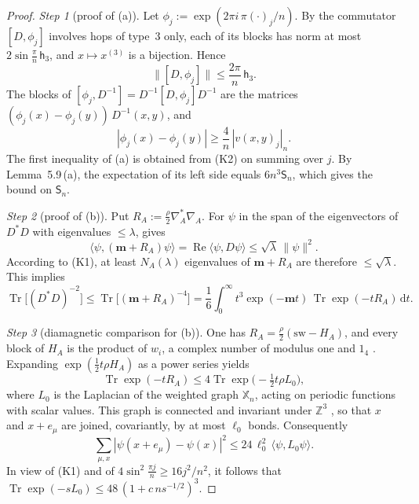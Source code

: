 \documentclass[11pt,letterpaper,reqno]{amsart}
\theoremstyle{definition}
\begin{document}
\begin{proof}
\emph{Step 1} (proof of (a)).
Let $\phi_j:=\exp(2\pi i\,\pi(\cdot)_j/n)$.
By \cite[Proposition~3.6\,(c)]{QEDII} the commutator $[D,\phi_j]$ involves hops of type~$3$ only, each of its blocks has norm at most $2\sin\frac\pi n\,\mathsf h_3$, and $x\mapsto x^{(3)}$ is a bijection.
Hence
\begin{equation*}
\|[D,\phi_j]\|\le\frac{2\pi}{n}\,\mathsf h_3.
\end{equation*}
The blocks of $[\phi_j,D^{-1}]=D^{-1}[D,\phi_j]D^{-1}$ are the matrices $(\phi_j(x)-\phi_j(y))\,D^{-1}(x,y)$, and
\begin{equation*}
|\phi_j(x)-\phi_j(y)|\ge\frac4n\,|v(x,y)_j|_n.
\end{equation*}
The first inequality of (a) is obtained from (K2) on summing over $j$.
By Lemma~5.9\,(a), the expectation of its left side equals $6n^3\mathsf S_n$, which gives the bound on $\mathsf S_n$.

\emph{Step 2} (proof of (b)).
Put $R_A:=\frac\rho2\nabla_A^*\nabla_A$.
For $\psi$ in the span of the eigenvectors of $D^*D$ with eigenvalues $\le\lambda$, \cite[Proposition~3.18\,(b)]{QEDII} gives
\begin{equation*}
\langle\psi,(\mathbf m+R_A)\psi\rangle=\operatorname{Re}\langle\psi,D\psi\rangle\le\sqrt\lambda\,\|\psi\|^2.
\end{equation*}
According to (K1), at least $N_A(\lambda)$ eigenvalues of $\mathbf m+R_A$ are therefore $\le\sqrt\lambda$.
This implies
\begin{equation*}
\operatorname{Tr}\bigl[(D^*D)^{-2}\bigr]\le\operatorname{Tr}\bigl[(\mathbf m+R_A)^{-4}\bigr]=\frac16\int_0^\infty t^3\exp(-\mathbf mt)\,\operatorname{Tr}\exp(-tR_A)\,\mathrm dt.
\end{equation*}

\emph{Step 3} (diamagnetic comparison for (b)).
One has $R_A=\frac\rho2(\mathrm{sw}-H_A)$, and every block of $H_A$ is the product of $w_i$, a complex number of modulus one and $1_4$ \cite[Proposition~3.18\,(a), (b)]{QEDII}.
Expanding $\exp(\frac12t\rho H_A)$ as a power series yields
\begin{equation*}
\operatorname{Tr}\exp(-tR_A)\le4\operatorname{Tr}\exp\bigl(-\tfrac12t\rho L_0\bigr),
\end{equation*}
where $L_0$ is the Laplacian of the weighted graph $\mathbb X_n$, acting on periodic functions with scalar values.
This graph is connected and invariant under $\mathbb Z^3$ \cite[Proposition~3.6\,(d)]{QEDII}, so that $x$ and $x+e_\mu$ are joined, covariantly, by at most $\ell_0$ bonds.
Consequently
\begin{equation*}
\sum_{\mu,x}|\psi(x+e_\mu)-\psi(x)|^2\le24\,\ell_0^2\,\langle\psi,L_0\psi\rangle.
\end{equation*}
In view of (K1) and of $4\sin^2\frac{\pi j}{n}\ge16j^2/n^2$, it follows that $\operatorname{Tr}\exp(-sL_0)\le48\,(1+c\,ns^{-1/2})^3$.


\end{proof}
\end{document}
